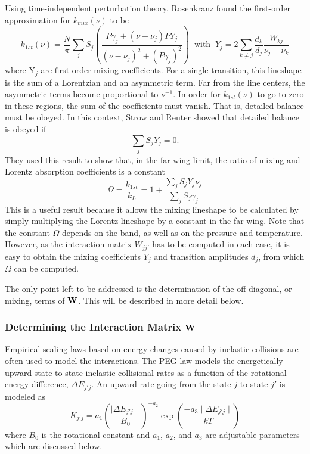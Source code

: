 \documentclass[11pt]{article}
\begin{document}
Using time-independent perturbation theory, Rosenkranz found the first-order 
approximation for $k_{mix}(\nu)$ to be 
\[
k_{1st}(\nu)=\frac{N}{\pi}\sum_{j} S_{j}
\left(\frac{P \gamma_{j}+ 
(\nu-\nu_{j})PY_{j}}{(\nu-\nu_{j})^{2}+(P\gamma_{j})^{2}}\right)
\; \; \mbox{with} \; \; 
Y_j=2\sum_{k\neq j}\frac{d_k}{d_j}\frac{W_{kj}}{\nu_j-\nu_k}
\]
where 
$\mbox{Y}_j$ are first-order mixing coefficients.  For a single transition, 
this lineshape is the sum of a Lorentzian and an asymmetric term.  Far from
the line centers, the asymmetric terms become proportional to $\nu^{-1}$.  
In order for $k_{1st}(\nu)$ to go to zero in these regions, the sum of the
coefficients must vanish.  That is, detailed balance must be obeyed.  In 
this context, Strow and Reuter\cite{str:88*1} showed that detailed balance 
is obeyed if
\[
 \sum_{j} S_{j} Y_{j}=0.
\]
They used this result to show that, in the far-wing limit, the 
ratio of mixing and Lorentz absorption coefficients is a
constant\cite{str:88*1}
\[
\Omega = \frac{k_{1st}}{k_{L}}= 1 + \frac{\sum_{j}S_{j}Y_{j}\nu_{j}}
{\sum_{j}S_{j}\gamma_{j}}
\]
This is a useful result because it allows the mixing lineshape to be
calculated by simply multiplying the Lorentz lineshape by a constant in
the far wing. Note that the constant $\Omega$ depends on the band, as well as
on the pressure and temperature. However, as the interaction matrix $W_{jj'}$
has to be computed in each case, it is easy to obtain the mixing coefficients 
$Y_{j}$ and transition amplitudes $d_{j}$, from which $\Omega$ can be computed.

The only point left to be addressed is the determination of the 
off-diagonal, or mixing, terms of ${\bf W}$. This will be described in 
more detail below.

\subsubsection{Determining the Interaction Matrix ${\bf W}$}

Empirical scaling laws based on energy changes caused by inelastic 
collisions are often used to model the interactions.  The PEG law models the
energetically upward state-to-state inelastic collisional rates as a 
function of the rotational energy difference, $\Delta E_{j'j}$.  An upward 
rate going from the state $j$ to state $j'$ is modeled as 
\[
 K_{j'j}=a_{1}\left(\frac{\mid\Delta E_{j'j}\mid}{B_{0}}\right)^{-a_{2}}
\exp\left(\frac{-a_{3}\mid\Delta E_{j'j}\mid}{kT}\right)
\]
where $B_{0}$ is the rotational constant and $a_{1}$, $a_{2}$, and $a_{3}$
are adjustable parameters which are discussed below. 
\end{document}
